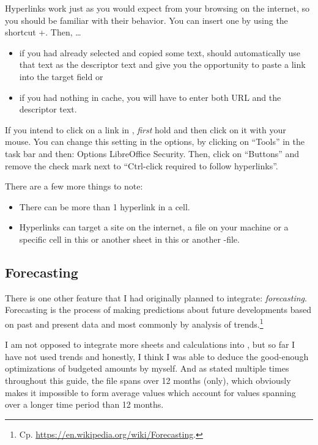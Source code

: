 Hyperlinks work just as you would expect from your browsing on the internet, so you should be familiar with their behavior.
You can insert one by using the shortcut +.
Then, \ldots
\begin{itemize}
	\item if you had already selected and copied some text, \loc should automatically use that text as the descriptor text and give you the opportunity to paste a link into the target field or
	\item if you had nothing in cache, you will have to enter both URL and the descriptor text.
\end{itemize}
If you intend to click on a link in \loc, \emph{first} hold  and then click on it with your mouse.
You can change this setting in the options, by clicking on ``Tools'' in the task bar and then: Options \structurenext LibreOffice \structurenext Security.
Then, click on ``Buttons'' and remove the check mark next to ``Ctrl-click required to follow hyperlinks''.

There are a few more things to note:
\begin{itemize}
	\item There can be more than 1 hyperlink in a cell.
	\item Hyperlinks can target a site on the internet, a file on your machine or a specific cell in this or another sheet in this or another \loc-file.
\end{itemize}

\subsection{Forecasting}
\label{subsec:forecasting}

There is one other feature that I had originally planned to integrate: \emph{forecasting}.
Forecasting is the process of making predictions about future developments based on past and present data and most commonly by analysis of trends.\footnote{Cp. \href{https://en.wikipedia.org/wiki/Forecasting}{https://en.wikipedia.org/wiki/Forecasting}.}

I am not opposed to integrate more sheets and calculations into \tfn, but so far I have not used trends and honestly, I think I was able to deduce the good-enough optimizations of budgeted amounts by myself.
And as stated multiple times throughout this guide, the file spans over 12 months (only), which obviously makes it impossible to form average values which account for values spanning over a longer time period than 12 months.